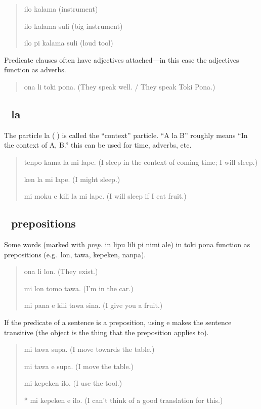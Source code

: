 \documentclass[statementpaper,oneside,article,14pt]{memoir}
\begin{document}
\begin{quote}
  ilo kalama (instrument)

  ilo kalama suli (big instrument)

  ilo pi kalama suli (loud tool)
\end{quote}

Predicate clauses often have adjectives attached---in this case the adjectives function as adverbs.

\begin{quote}
  ona li toki pona. (They speak well. / They speak Toki Pona.)
\end{quote}

\subsection{{\sitpon󱤡} la}

\noindent The particle la ({\sitpon󱤡}) is called the ``context'' particle. 
``A la B'' roughly means ``In the context of A, B.'' this can be used for time, adverbs, etc.

\begin{quote}
  tenpo kama la mi lape. (I sleep in the context of coming time; I will sleep.)

  ken la mi lape. (I might sleep.)

  mi moku e kili la mi lape. (I will sleep if I eat fruit.)
\end{quote}

\subsection{{\sitpon󱤬} prepositions}

\noindent Some words (marked with \textit{prep.} in lipu lili pi nimi ale) in toki pona 
function as prepositions (e.g.\ lon, tawa, kepeken, nanpa).

\begin{quote}
  ona li lon. (They exist.)

  mi lon tomo tawa. (I'm in the car.)

  mi pana e kili tawa sina. (I give you a fruit.)
\end{quote}

If the predicate of a sentence is a preposition, using e makes the sentence transitive (the object is the thing that the preposition applies to).

\begin{quote}
  mi tawa supa. (I move towards the table.)

  mi tawa e supa. (I move the table.)

  mi kepeken ilo. (I use the tool.)

  * mi kepeken e ilo. (I can't think of a good translation for this.)
\end{quote}
\end{document}
